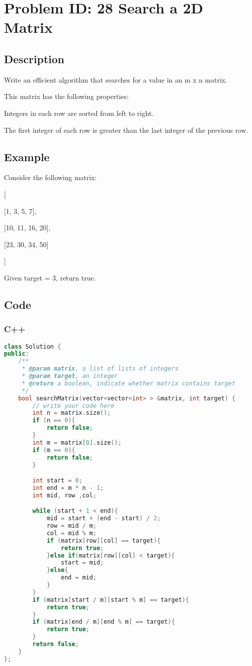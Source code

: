 \section{Problem ID: 28 Search a 2D Matrix}
\subsection{Description}
Write an efficient algorithm that searches for a value in an m x n matrix.

This matrix has the following properties:

Integers in each row are sorted from left to right.

The first integer of each row is greater than the last integer of the previous row.

\subsection{Example}
Consider the following matrix:

[

    [1, 3, 5, 7],
    
    [10, 11, 16, 20],
    
    [23, 30, 34, 50]
    
]

Given target = 3, return true.

\subsection{Code}
\scriptsize
\subsubsection{C++}
\begin{lstlisting}[language=C++]
class Solution {
public:
    /**
     * @param matrix, a list of lists of integers
     * @param target, an integer
     * @return a boolean, indicate whether matrix contains target
     */
    bool searchMatrix(vector<vector<int> > &matrix, int target) {
        // write your code here
        int n = matrix.size();
        if (n == 0){
            return false;
        }
        int m = matrix[0].size();
        if (m == 0){
            return false;
        }

        int start = 0;
        int end = m * n - 1;
        int mid, row ,col;

        while (start + 1 < end){
            mid = start + (end - start) / 2;
            row = mid / m;
            col = mid % m;
            if (matrix[row][col] == target){
                return true;
            }else if(matrix[row][col] < target){
                start = mid;
            }else{
                end = mid;
            }
        }
        if (matrix[start / m][start % m] == target){
            return true;
        }
        if (matrix[end / m][end % m] == target){
            return true;
        }
        return false;
    }
};

\end{lstlisting}


